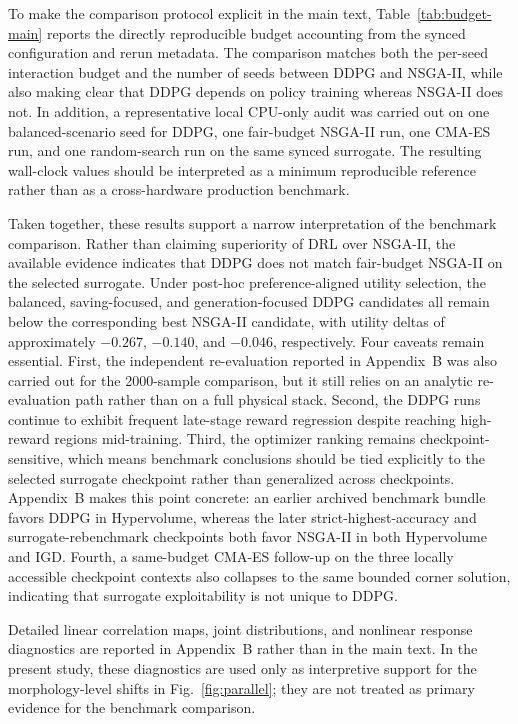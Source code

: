 \documentclass[final,3p,times]{elsarticle}
\begin{document}
To make the comparison protocol explicit in the main text, Table~\ref{tab:budget-main} reports the directly reproducible budget accounting from the synced configuration and rerun metadata. The comparison matches both the per-seed interaction budget and the number of seeds between DDPG and NSGA-II, while also making clear that DDPG depends on policy training whereas NSGA-II does not. In addition, a representative local CPU-only audit was carried out on one balanced-scenario seed for DDPG, one fair-budget NSGA-II run, one CMA-ES run, and one random-search run on the same synced surrogate. The resulting wall-clock values should be interpreted as a minimum reproducible reference rather than as a cross-hardware production benchmark.

Taken together, these results support a narrow interpretation of the benchmark comparison. Rather than claiming superiority of DRL over NSGA-II, the available evidence indicates that DDPG does not match fair-budget NSGA-II on the selected surrogate. Under post-hoc preference-aligned utility selection, the balanced, saving-focused, and generation-focused DDPG candidates all remain below the corresponding best NSGA-II candidate, with utility deltas of approximately $-0.267$, $-0.140$, and $-0.046$, respectively. Four caveats remain essential. First, the independent re-evaluation reported in Appendix~B was also carried out for the 2000-sample comparison, but it still relies on an analytic re-evaluation path rather than on a full physical stack. Second, the DDPG runs continue to exhibit frequent late-stage reward regression despite reaching high-reward regions mid-training. Third, the optimizer ranking remains checkpoint-sensitive, which means benchmark conclusions should be tied explicitly to the selected surrogate checkpoint rather than generalized across checkpoints. Appendix~B makes this point concrete: an earlier archived benchmark bundle favors DDPG in Hypervolume, whereas the later strict-highest-accuracy and surrogate-rebenchmark checkpoints both favor NSGA-II in both Hypervolume and IGD. Fourth, a same-budget CMA-ES follow-up on the three locally accessible checkpoint contexts also collapses to the same bounded corner solution, indicating that surrogate exploitability is not unique to DDPG.

Detailed linear correlation maps, joint distributions, and nonlinear response diagnostics are reported in Appendix~B rather than in the main text. In the present study, these diagnostics are used only as interpretive support for the morphology-level shifts in Fig.~\ref{fig:parallel}; they are not treated as primary evidence for the benchmark comparison.
\end{document}
